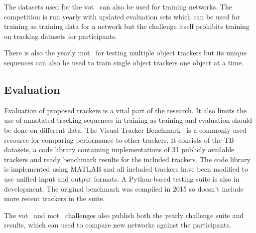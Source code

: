 The datasets used for the \ac{vot}~\cite{VOT} can also be used for training networks. The competition
is run yearly with updated evaluation sets which can be used for training as training
data for a network but the challenge itself prohibits training on tracking datasets for
participants.

There is also the yearly \ac{mot}~\cite{MOT16} for testing multiple object trackers but
its unique sequences can also be used to train single object trackers one object at a
time.

\subsection{Evaluation}
Evaluation of proposed trackers is a vital part of the research. It also limits the use
of annotated tracking sequences in training as training and evaluation should be done
on different data. The Visual Tracker Benchmark~\cite{VTB} is a commonly used resource
for comparing performance to other trackers. It consists of the TB-datasets, a code
library containing implementations of 31 publicly available trackers and ready benchmark
results for the included trackers. The code library is implemented using MATLAB and all
included trackers have been modified to use unified input and output formats. A
Python-based testing suite is also in development. The original benchmark was compiled
in 2015 so doesn't include more recent trackers in the suite.

The \ac{vot}~\cite{VOT} and \ac{mot}~\cite{MOT16} challenges also publish both the
yearly challenge suite and results, which can used to compare new networks against the
participants.
